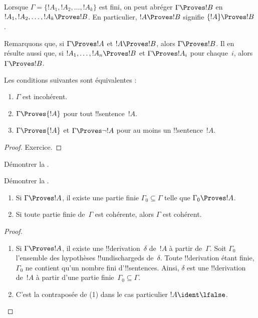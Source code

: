 \documentclass[11pt,a4paper,openany]{memoir}
\begin{document}
Lorsque $\Gamma = \{!A_1, !A_2, \ldots, !A_k\}$ est fini, on peut
abréger $\Gamma \Proves !B$ en
$!A_1,!A_2,\ldots,!A_k \Proves !B$. En particulier,
$!A \Proves !B$ signifie $\{!A\} \Proves !B$.

Remarquons que, si $\Gamma \Proves !A$ et $!A \Proves !B$, alors
$\Gamma \Proves !B$. Il en résulte aussi que, si
$!A_1, \dots, !A_n \Proves !B$ et $\Gamma \Proves !A_i$ pour
chaque~$i$, alors $\Gamma \Proves !B$.

\begin{prop}
Les conditions suivantes sont équivalentes :
    \begin{enumerate}
      \item \( \Gamma \) est incohérent.
      \item \( \Gamma \Proves {!A} \) pour tout !!{sentence}~\( {!A} \).
      \item \( \Gamma \Proves {!A} \) et \( \Gamma \Proves \lnot {!A} \) pour au moins un !!{sentence}~\( {!A} \).
    \end{enumerate}
\end{prop}

\begin{proof}
Exercice.
\end{proof}

\begin{prob}
Démontrer la .
\end{prob}
\tagendprob

\begin{prob}
Démontrer la .
\end{prob}
\tagendprob

\begin{prop}[Compacité]
  \begin{enumerate}
  \item Si $\Gamma \Proves !A$, il existe une partie finie
    $\Gamma_0 \subseteq \Gamma$ telle que $\Gamma_0 \Proves !A$.
  \item Si toute partie finie de~$\Gamma$ est cohérente,
    alors $\Gamma$ est cohérent.
  \end{enumerate}
\end{prop}

\begin{proof}
  \begin{enumerate}
    \item Si $\Gamma \Proves !A$, il existe une
      !!{derivation}~$\delta$ de~$!A$ à partir de~$\Gamma$.
      Soit $\Gamma_0$ l'ensemble des hypothèses
      !!{undischarged}s de~$\delta$. Toute !!{derivation} étant
      finie, $\Gamma_0$ ne contient qu'un nombre fini
      d'!!{sentence}s. Ainsi, $\delta$ est une !!{derivation}
      de~$!A$ à partir d'une partie finie~$\Gamma_0 \subseteq \Gamma$.
    \item C'est la contraposée de (1) dans le cas particulier
      $!A \ident \lfalse$.
  \end{enumerate}
\end{proof}
\end{document}
